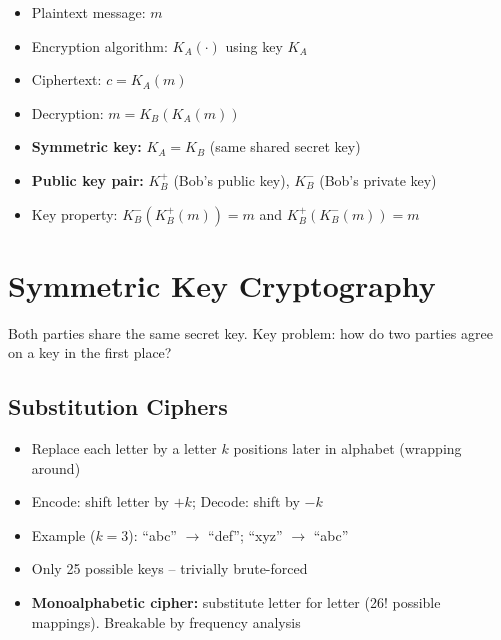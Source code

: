 \begin{tcolorbox}[keybox, title=Cryptography Notation]
\begin{itemize}[noitemsep]
  \item Plaintext message: $m$
  \item Encryption algorithm: $K_A(\cdot)$ using key $K_A$
  \item Ciphertext: $c = K_A(m)$
  \item Decryption: $m = K_B(K_A(m))$
  \item \textbf{Symmetric key:} $K_A = K_B$ (same shared secret key)
  \item \textbf{Public key pair:} $K_B^+$ (Bob's public key), $K_B^-$ (Bob's private key)
  \item Key property: $K_B^-(K_B^+(m)) = m$ \quad and \quad $K_B^+(K_B^-(m)) = m$
\end{itemize}
\end{tcolorbox}

\section{Symmetric Key Cryptography}

Both parties share the same secret key. Key problem: how do two parties agree on a key in the first place?

\subsection{Substitution Ciphers}

\begin{tcolorbox}[keybox, title=Caesar Cipher -- Simple Substitution]
\begin{itemize}[noitemsep]
  \item Replace each letter by a letter $k$ positions later in alphabet (wrapping around)
  \item Encode: shift letter by $+k$; Decode: shift by $-k$
  \item Example ($k=3$): ``abc'' $\rightarrow$ ``def''; ``xyz'' $\rightarrow$ ``abc''
  \item Only 25 possible keys -- trivially brute-forced
  \item \textbf{Monoalphabetic cipher:} substitute letter for letter (26! possible mappings). Breakable by frequency analysis
\end{itemize}
\end{tcolorbox}

